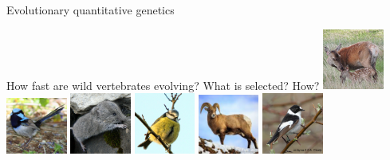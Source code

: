 \documentclass[10pt]{beamer}%
\title[https://timotheenivalis.github.io/]{}
\date{}
\author[\footnotesize Dr. Timoth\'ee Bonnet ]{ }
\begin{document}
% 
% 
\begin{frame}{Evolutionary quantitative genetics}
   
    \begin{alertblock}{How fast are wild vertebrates evolving? What is selected? How?}
    \centering
        \includegraphics[width=0.15\textwidth]{Figures/doe}
        \includegraphics[width=0.15\textwidth]{Figures/sfw}
        \includegraphics[width=0.15\textwidth]{Figures/vole}
        \includegraphics[width=0.15\textwidth]{Figures/bt}
        \includegraphics[width=0.15\textwidth]{Figures/bgs}
        \includegraphics[width=0.15\textwidth]{Figures/cfc}
    \end{alertblock}
    
    \pause
    

\end{frame}
\end{document}
